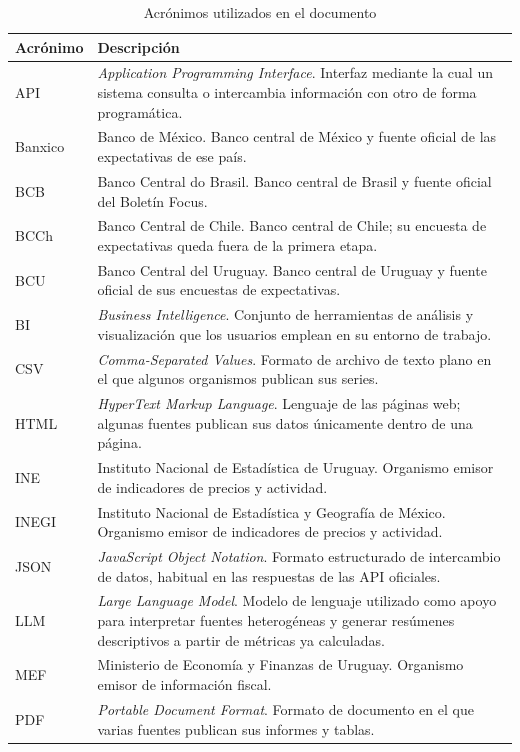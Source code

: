 \documentclass[11pt,a4paper]{article}
\begin{document}
\begin{table}[htbp]
\centering
\caption{Acr\'onimos utilizados en el documento}
\label{tab:acronimos}
\begin{tabularx}{\textwidth}{l X}
\toprule
\textbf{Acr\'onimo} & \textbf{Descripci\'on} \\
\midrule
API     & \emph{Application Programming Interface}. Interfaz mediante la cual un sistema consulta o intercambia informaci\'on con otro de forma program\'atica. \\
Banxico & Banco de M\'exico. Banco central de M\'exico y fuente oficial de las expectativas de ese pa\'is. \\
BCB     & Banco Central do Brasil. Banco central de Brasil y fuente oficial del Bolet\'in Focus. \\
BCCh    & Banco Central de Chile. Banco central de Chile; su encuesta de expectativas queda fuera de la primera etapa. \\
BCU     & Banco Central del Uruguay. Banco central de Uruguay y fuente oficial de sus encuestas de expectativas. \\
BI      & \emph{Business Intelligence}. Conjunto de herramientas de an\'alisis y visualizaci\'on que los usuarios emplean en su entorno de trabajo. \\
CSV     & \emph{Comma-Separated Values}. Formato de archivo de texto plano en el que algunos organismos publican sus series. \\
HTML    & \emph{HyperText Markup Language}. Lenguaje de las p\'aginas web; algunas fuentes publican sus datos \'unicamente dentro de una p\'agina. \\
INE     & Instituto Nacional de Estad\'istica de Uruguay. Organismo emisor de indicadores de precios y actividad. \\
INEGI   & Instituto Nacional de Estad\'istica y Geograf\'ia de M\'exico. Organismo emisor de indicadores de precios y actividad. \\
JSON    & \emph{JavaScript Object Notation}. Formato estructurado de intercambio de datos, habitual en las respuestas de las API oficiales. \\
LLM     & \emph{Large Language Model}. Modelo de lenguaje utilizado como apoyo para interpretar fuentes heterog\'eneas y generar res\'umenes descriptivos a partir de m\'etricas ya calculadas. \\
MEF     & Ministerio de Econom\'ia y Finanzas de Uruguay. Organismo emisor de informaci\'on fiscal. \\
PDF     & \emph{Portable Document Format}. Formato de documento en el que varias fuentes publican sus informes y tablas. \\

\end{tabularx}
\end{table}
\end{document}
